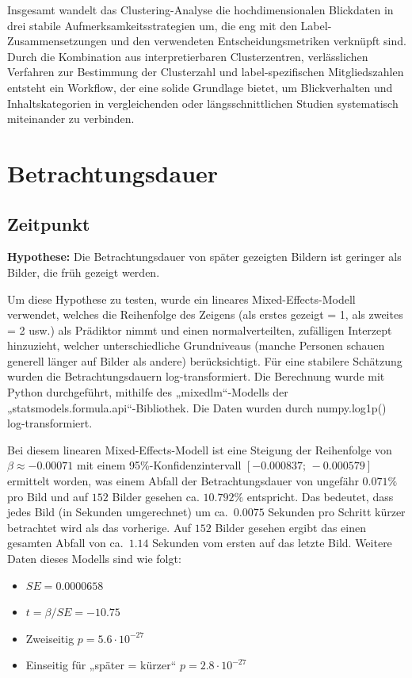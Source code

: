\documentclass[
    language=german, %
    thesis=seminar, %
    supervisor=postdoc, %
    multiauthor=true, %
    ]{settings/csssa-thesis}
\begin{document}
Insgesamt wandelt das Clustering-Analyse die hochdimensionalen Blickdaten in drei stabile Aufmerksamkeitsstrategien um, die eng mit den Label-Zusammensetzungen und den verwendeten Entscheidungsmetriken verknüpft sind. Durch die Kombination aus interpretierbaren Clusterzentren, verlässlichen Verfahren zur Bestimmung der Clusterzahl und label-spezifischen Mitgliedszahlen entsteht ein Workflow, der eine solide Grundlage bietet, um Blickverhalten und Inhaltskategorien in vergleichenden oder längsschnittlichen Studien systematisch miteinander zu verbinden.

\section{Betrachtungsdauer}
\subsection{Zeitpunkt}
 \textbf{Hypothese:} Die Betrachtungsdauer von später gezeigten Bildern ist geringer als Bilder, die früh gezeigt werden. 

Um diese Hypothese zu testen, wurde ein lineares Mixed-Effects-Modell verwendet, 
welches die Reihenfolge des Zeigens (als erstes gezeigt = 1, als zweites = 2 usw.) 
als Prädiktor nimmt und einen normalverteilten, zufälligen Interzept hinzuzieht,
welcher unterschiedliche Grundniveaus (manche Personen schauen generell länger auf Bilder als andere) berücksichtigt.
Für eine stabilere Schätzung wurden die Betrachtungsdauern log-transformiert. Die Berechnung wurde mit Python durchgeführt, 
mithilfe des „mixedlm“-Modells der „statsmodels.formula.api“-Bibliothek. Die Daten wurden durch numpy.log1p() log-transformiert.

Bei diesem linearen Mixed-Effects-Modell ist eine Steigung der Reihenfolge von 
$\beta \approx -0.00071$ mit einem 95\%-Konfidenzintervall 
$[-0.000837;\,-0.000579]$ ermittelt worden, was einem Abfall der Betrachtungsdauer 
von ungefähr $0.071\%$ pro Bild und auf $152$ Bilder gesehen ca. $10.792\%$ entspricht. 
Das bedeutet, dass jedes Bild (in Sekunden umgerechnet) um ca.\ $0.0075$ Sekunden pro Schritt 
kürzer betrachtet wird als das vorherige. Auf $152$ Bilder gesehen ergibt das 
einen gesamten Abfall von ca.\ $1.14$ Sekunden vom ersten auf das letzte Bild. 
Weitere Daten dieses Modells sind wie folgt:

\begin{itemize}
  \item $SE = 0.0000658$
  \item $t = \beta / SE = -10.75$
  \item Zweiseitig $p = 5.6 \cdot 10^{-27}$
  \item Einseitig für „später = kürzer“ $p = 2.8 \cdot 10^{-27}$
\end{itemize}
\end{document}
